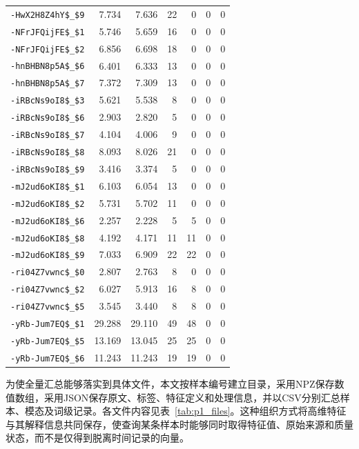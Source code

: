 \begin{longtable}{lrrrrrr}
\nolinkurl{-HwX2H8Z4hY$_$9} & 7.734 & 7.636 & 22 & 0 & 0 & 0\\
\nolinkurl{-NFrJFQijFE$_$1} & 5.746 & 5.659 & 16 & 0 & 0 & 0\\
\nolinkurl{-NFrJFQijFE$_$2} & 6.856 & 6.698 & 18 & 0 & 0 & 0\\
\nolinkurl{-hnBHBN8p5A$_$6} & 6.401 & 6.333 & 13 & 0 & 0 & 0\\
\nolinkurl{-hnBHBN8p5A$_$7} & 7.372 & 7.309 & 13 & 0 & 0 & 0\\
\nolinkurl{-iRBcNs9oI8$_$3} & 5.621 & 5.538 & 8 & 0 & 0 & 0\\
\nolinkurl{-iRBcNs9oI8$_$6} & 2.903 & 2.820 & 5 & 0 & 0 & 0\\
\nolinkurl{-iRBcNs9oI8$_$7} & 4.104 & 4.006 & 9 & 0 & 0 & 0\\
\nolinkurl{-iRBcNs9oI8$_$8} & 8.093 & 8.026 & 21 & 0 & 0 & 0\\
\nolinkurl{-iRBcNs9oI8$_$9} & 3.416 & 3.374 & 5 & 0 & 0 & 0\\
\nolinkurl{-mJ2ud6oKI8$_$1} & 6.103 & 6.054 & 13 & 0 & 0 & 0\\
\nolinkurl{-mJ2ud6oKI8$_$2} & 5.731 & 5.702 & 11 & 0 & 0 & 0\\
\nolinkurl{-mJ2ud6oKI8$_$6} & 2.257 & 2.228 & 5 & 5 & 0 & 0\\
\nolinkurl{-mJ2ud6oKI8$_$8} & 4.192 & 4.171 & 11 & 11 & 0 & 0\\
\nolinkurl{-mJ2ud6oKI8$_$9} & 7.033 & 6.909 & 22 & 22 & 0 & 0\\
\nolinkurl{-ri04Z7vwnc$_$0} & 2.807 & 2.763 & 8 & 0 & 0 & 0\\
\nolinkurl{-ri04Z7vwnc$_$2} & 6.027 & 5.913 & 16 & 8 & 0 & 0\\
\nolinkurl{-ri04Z7vwnc$_$5} & 3.545 & 3.440 & 8 & 8 & 0 & 0\\
\nolinkurl{-yRb-Jum7EQ$_$1} & 29.288 & 29.110 & 49 & 48 & 0 & 0\\
\nolinkurl{-yRb-Jum7EQ$_$5} & 13.169 & 13.045 & 25 & 25 & 0 & 0\\
\nolinkurl{-yRb-Jum7EQ$_$6} & 11.243 & 11.243 & 19 & 19 & 0 & 0\\
\end{longtable}
\endgroup

为使全量汇总能够落实到具体文件，本文按样本编号建立目录，采用NPZ保存数值数组，采用JSON保存原文、标签、特征定义和处理信息，并以CSV分别汇总样本、模态及词级记录。各文件内容见表~\ref{tab:p1_files}。这种组织方式将高维特征与其解释信息共同保存，使查询某条样本时能够同时取得特征值、原始来源和质量状态，而不是仅得到脱离时间记录的向量。

